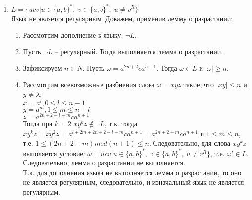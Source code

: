 \documentclass{article}
\begin{document}
\begin{enumerate}
    \item \(L = \{ucv | u \in \{a, b\}^*, \; v \in \{a, b\}^*, \; u \neq v^R \}\) \\
        Язык не является регулярным. Докажем, применив лемму о разрастании:
    \begin{enumerate}
        \item Рассмотрим дополнение к языку: \(\neg L\).
        \item Пусть \(\neg L\) – регулярный. Тогда выполняется лемма о разрастании.
        \item Зафиксируем \(n \in N\). Пусть \(\omega = a^{2n + 2}ca^{n + 1}\). Тогда \(\omega \in L\) и \(|\omega| \geq n\).
        \item Рассмотрим всевозможные разбиения слова \(\omega = xyz\) такие, что \(|xy| \leq n\) и \(y \neq \lambda\):\\
        \(x = a^{l}, 0 \leq l \leq n - 1\)\\
        \(y = a^{m}, 1 \leq m \leq n - l\)\\
        \(z = a^{2n + 2 - l - m}ca^{n + 1}\)\\
        Тогда при \(k = 2\) \(xy^{k}z \notin \neg L\), т.к. тогда \(xy^{k}z = xy^{2}z = a^{l + 2m + 2n + 2 - l - m}ca^{n + 1} = a^{2n + 2 + m}ca^{n + 1}\) и \(1 \leq m \leq n\), т.е. \(1 \leq (2n + 2 + m) mod (n + 1) \leq n\). Следовательно, для слова \(xy^{k}z\) выполяется условие: \(\omega = ucv | u \in \{a, b\}^*, \; v \in \{a, b\}^*, \; u \neq v^R \}\), т.е. \(\omega' \in L\). Следовательно, лемма о разрастании не выполняется.\\
        Т.к. для дополнения языка не выполняется лемма о разрастании, то оно не является регулярным, следовательно, и изначальный язык не является регулярным.
    \end{enumerate}
\end{enumerate}
\end{document}
